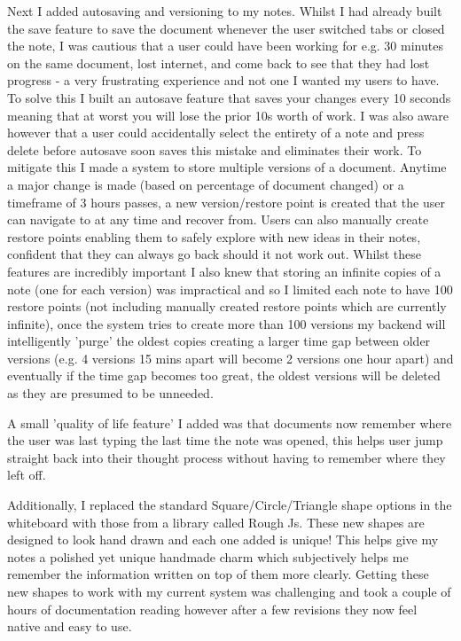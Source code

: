 Next I added autosaving and versioning to my notes. Whilst I had already built the save feature to save the document whenever the user switched tabs or closed the note, I was cautious that a user could have been working for e.g. 30 minutes on the same document, lost internet, and come back to see that they had lost progress - a very frustrating experience and not one I wanted my users to have. To solve this I built an autosave feature that saves your changes every 10 seconds meaning that at worst you will lose the prior 10s worth of work. I was also aware however that a user could accidentally select the entirety of a note and press delete before autosave soon saves this mistake and eliminates their work. To mitigate this I made a system to store multiple versions of a document. Anytime a major change is made (based on percentage of document changed) or a timeframe of 3 hours passes, a new version/restore point is created that the user can navigate to at any time and recover from. Users can also manually create restore points enabling them to safely explore with new ideas in their notes, confident that they can always go back should it not work out. Whilst these features are incredibly important I also knew that storing an infinite copies of a note (one for each version) was impractical and so I limited each note to have 100 restore points (not including manually created restore points which are currently infinite), once the system tries to create more than 100 versions my backend will intelligently 'purge' the oldest copies creating a larger time gap between older versions (e.g. 4 versions 15 mins apart will become 2 versions one hour apart) and eventually if the time gap becomes too great, the oldest versions will be deleted as they are presumed to be unneeded.

A small 'quality of life feature' I added was that documents now remember where the user was last typing the last time the note was opened, this helps user jump straight back into their thought process without having to remember where they left off.

Additionally, I replaced the standard Square/Circle/Triangle shape options in the whiteboard with those from a library called Rough Js. These new shapes are designed to look hand drawn and each one added is unique! This helps give my notes a polished yet unique handmade charm which subjectively helps me remember the information written on top of them more clearly. Getting these new shapes to work with my current system was challenging and took a couple of hours of documentation reading however after a few revisions they now feel native and easy to use.


